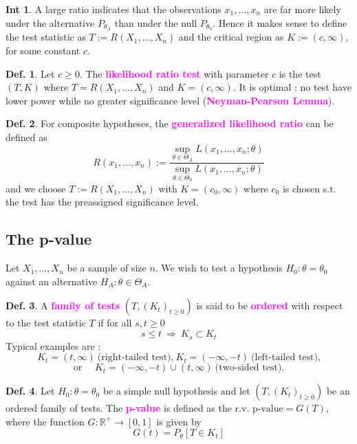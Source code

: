 \documentclass[8pt,a4paper,landscape]{article}
\theoremstyle{definition}
\newtheorem{definition}{Def.}[section]
\theoremstyle{example}
\theoremstyle{intuition}
\newtheorem*{intuition}{Int}
\theoremstyle{definition}
\newcommand{\mydef}[1]{\textcolor{magenta}{\textbf{#1}}}
\begin{document}
\begin{multicols}{3}
				\begin{intuition}
					A large ratio indicates that the observations $x_1, \ldots, x_n$ are far more likely under the alternative $P_{\theta_A}$ than under the null $P_{\theta_0}$. Hence it makes sense to define the test statistic as $T := R(X_1, \ldots, X_n)$ and the critical region as $K := (c, \infty)$, for some constant $c$.
				\end{intuition}

				\begin{definition}
					Let $c \geq 0$. The \mydef{likelihood ratio test} with parameter $c$ is the test $(T,K)$ where $T = R(X_1, \ldots, X_n)$ and $K = (c, \infty)$. It is optimal : no test have lower power while no greater significance level (\mydef{Neyman-Pearson Lemma}).
				\end{definition}

				\begin{definition}
					For composite hypotheses, the \mydef{generalized likelihood ratio} can be defined as 
					$$
						R(x_1, \ldots, x_n) := \frac{\sup_{\theta \in \Theta_A} L(x_1, \ldots, x_n ; \theta)}{\sup_{\theta \in \Theta_0} L(x_1, \ldots, x_n ; \theta)}
					$$
					and we choose $T := R(X_1, \ldots, X_n)$ with $K = (c_0, \infty)$ where $c_0$ is chosen s.t. the test has the preassigned significance level.
				\end{definition}


			\subsection{The p-value}
				Let $X_1, \ldots, X_n$ be a sample of size $n$. We wish to test a hypothesis $H_0 : \theta = \theta_0$ against an alternative $H_A : \theta \in \Theta_A$.

				\begin{definition}
					A \mydef{family of tests} $(T, (K_t)_{t \geq 0})$ is said to be \mydef{ordered} with respect to the test statistic $T$ if for all $s,t \geq 0$
					$$
						s \leq t \ \Longrightarrow \ K_s \subset K_t
					$$
					Typical examples are :
					$$
						K_t = (t, \infty) \ \text{(right-tailed test),} \ K_t = (-\infty, -t) \ \text{(left-tailed test),}
					$$
					$$
					 	\text{or } \quad K_t = (-\infty, -t) \cup (t, \infty) \ \text{(two-sided test).}
					$$
				\end{definition}

				\begin{definition}
					Let $H_0 : \theta = \theta_0$ be a simple null hypothesis and let $(T, (K_t)_{t \geq 0})$ be an ordered family of tests. The \mydef{p-value} is defined as the r.v. $\text{p-value} = G(T)$, where the function $G : \mathbb{R}^+ \to [0,1]$ is given by 
					$$
						G(t) = P_\theta [T \in K_t]
					$$
				\end{definition}


\end{multicols}
\end{document}
